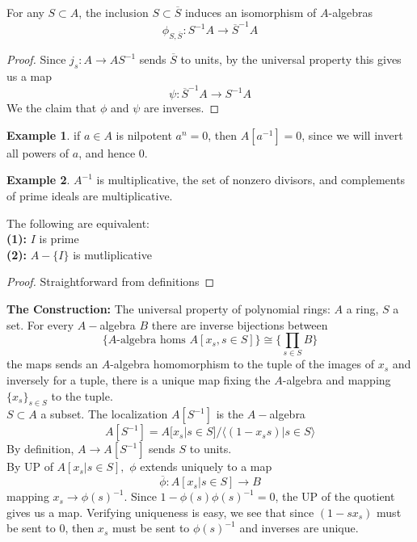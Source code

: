 \documentclass{article}
\theoremstyle{definition}
\newtheorem{example}{Example}[section]
\theoremstyle{definition}
\theoremstyle{remark}
\begin{document}
\begin{coroll}{}
	For any $S \subset A$, the inclusion $S \subset \overline{S}$ induces an isomorphism of $A$-algebras
	\[\phi_{S, \overline{S}}: S^{-1}A \to \overline{S}^{-1}A\]
\end{coroll}

\begin{proof}
	Since $j_s: A \to AS^{-1}$ sends $\overline{S}$ to units, by the universal property this gives us a map 
	\[\psi: \overline{S}^{-1}A \to S^{-1}A\]
We the claim that $\phi$ and $\psi$ are inverses.
\end{proof}

\begin{example}
	if $a \in A$ is nilpotent $a^n = 0$, then $A[a^{-1}] = 0$, since we will invert all powers of $a$, and hence 0.
\end{example}

\begin{example}
	$A^{-1}$ is multiplicative, the set of nonzero divisors, and complements of prime ideals are multiplicative.
\end{example}

\begin{lemm}{}
	The following are equivalent:\\
	\indent \textbf{(1):} $I$ is prime \\
	\indent \textbf{(2):} $A - \{I\}$ is mutliplicative
\end{lemm}
 \begin{proof}
 	Straightforward from definitions
 \end{proof}
 
 \textbf{The Construction: } The universal property of polynomial rings: $A$ a ring, $S$ a set.
 For every $A-$algebra $B$ there are inverse bijections between
 \[\{\text{$A$-algebra homs $A[x_s, s \in S]$}
 \} \cong \{ \prod_{s \in S} B\}\]
 the maps sends an $A$-algebra homomorphism to the tuple of the images of $x_s$ and inversely for a tuple, there is a unique map fixing the $A$-algebra and mapping $\{x_s\}_{s \in S}$ to the tuple.\\

 $S \subset A$ a subset.
 The localization $A[S^{-1}]$ is the $A-$algebra 
 \[A[S^{-1}] = A[x_s|s \in S]/ \langle (1 - x_ss)| s \in S\rangle\]
 By definition, $A \to A[S^{-1}]$ sends $S$ to units.\\

 By UP of $A[x_s|s \in S],$ $\phi$ extends uniquely to a map 
 \[\overline{\phi}: A[x_s|s \in S] \to B\]
 mapping $x_s \to \phi(s)^{-1}$.
 Since $1 - \phi(s)\phi(s)^{-1} = 0$, the UP of the quotient gives us a map.
 Verifying uniqueness is easy, we see that since $(1 - sx_s)$ must be sent to $0$, then $x_s$ must be sent to $\phi(s)^{-1}$ and inverses are unique.\\
 
\end{document}

